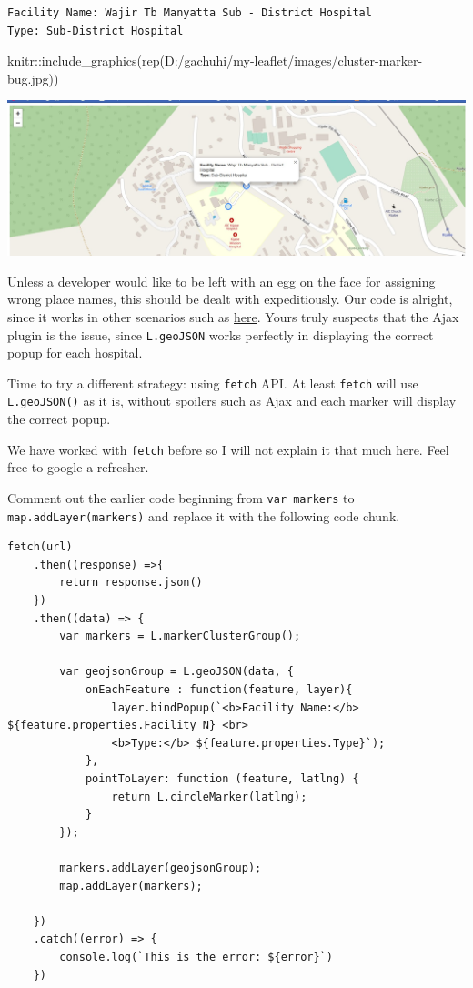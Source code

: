 \documentclass[
]{book}
\newenvironment{Shaded}{\begin{snugshade}}{\end{snugshade}}
\newcommand{\FunctionTok}[1]{\textcolor[rgb]{0.00,0.00,0.00}{#1}}
\newcommand{\NormalTok}[1]{#1}
\newcommand{\SpecialCharTok}[1]{\textcolor[rgb]{0.00,0.00,0.00}{#1}}
\newcommand{\StringTok}[1]{\textcolor[rgb]{0.31,0.60,0.02}{#1}}
\begin{document}
\begin{verbatim}
Facility Name: Wajir Tb Manyatta Sub - District Hospital
Type: Sub-District Hospital
\end{verbatim}

\begin{Shaded}
\begin{Highlighting}[]
\NormalTok{knitr}\SpecialCharTok{::}\FunctionTok{include\_graphics}\NormalTok{(}\FunctionTok{rep}\NormalTok{(}\StringTok{\textquotesingle{}D:/gachuhi/my{-}leaflet/images/cluster{-}marker{-}bug.jpg\textquotesingle{}}\NormalTok{))}
\end{Highlighting}
\end{Shaded}

\includegraphics[width=26.26in]{../images/cluster-marker-bug}

Unless a developer would like to be left with an egg on the face for assigning wrong place names, this should be dealt with expeditiously. Our code is alright, since it works in other scenarios such as \href{https://gis.stackexchange.com/questions/346104/popup-with-leaflet-markercluster-in-leaflet-map?utm_source=pocket_reader}{here}. Yours truly suspects that the Ajax plugin is the issue, since \texttt{L.geoJSON} works perfectly in displaying the correct popup for each hospital.

Time to try a different strategy: using \texttt{fetch} API. At least \texttt{fetch} will use \texttt{L.geoJSON()} as it is, without spoilers such as Ajax and each marker will display the correct popup.

We have worked with \texttt{fetch} before so I will not explain it that much here. Feel free to google a refresher.

Comment out the earlier code beginning from \texttt{var\ markers} to \texttt{map.addLayer(markers)} and replace it with the following code chunk.

\begin{verbatim}
fetch(url)
    .then((response) =>{
        return response.json()
    })
    .then((data) => {
        var markers = L.markerClusterGroup();

        var geojsonGroup = L.geoJSON(data, {
            onEachFeature : function(feature, layer){
                layer.bindPopup(`<b>Facility Name:</b> ${feature.properties.Facility_N} <br>
                <b>Type:</b> ${feature.properties.Type}`);
            },
            pointToLayer: function (feature, latlng) {
                return L.circleMarker(latlng);
            }
        });

        markers.addLayer(geojsonGroup);
        map.addLayer(markers);

    })
    .catch((error) => {
        console.log(`This is the error: ${error}`)
    })
\end{verbatim}
\end{document}
